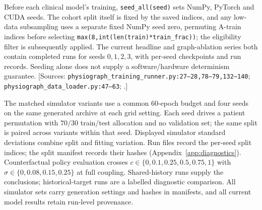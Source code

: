 Before each clinical model's training, \texttt{seed\_\allowbreak{}all(seed)} sets NumPy, PyTorch and CUDA seeds. The cohort split itself is fixed by the saved indices, and any low-data subsampling uses a separate fixed NumPy seed zero, permuting A-train indices before selecting \texttt{max(8,\allowbreak{}int(len(train)*train\_\allowbreak{}frac))}; the eligibility filter is subsequently applied. The current headline and graph-ablation series both contain completed runs for seeds $0,1,2,3$, with per-seed checkpoints and run records. Seeding alone does not supply a software/hardware determinism guarantee. [Sources: \texttt{physiograph\_\allowbreak{}training\_\allowbreak{}runner.\allowbreak{}py:\allowbreak{}27–\allowbreak{}28,\allowbreak{}78–\allowbreak{}79,\allowbreak{}132–\allowbreak{}140}; \texttt{physiograph\_\allowbreak{}data\_\allowbreak{}loader.\allowbreak{}py:\allowbreak{}47–\allowbreak{}63}; .]

The matched simulator variants use a common $60$-epoch budget and four seeds on the same generated archive at each grid setting. Each seed drives a patient permutation with $70/30$ train/test allocation and no validation set; the same split is paired across variants within that seed. Displayed simulator standard deviations combine split and fitting variation. Run files record the per-seed split indices; the split manifest records their hashes (Appendix~\ref{app:diagnostics}). Counterfactual policy evaluation crosses $c\in\{0,0.1,0.25,0.5,0.75,1\}$ with $\sigma\in\{0,0.08,0.15,0.25\}$ at full coupling. Shared-history runs supply the conclusions; historical-target runs are a labelled diagnostic comparison. All simulator sets carry generation settings and hashes in manifests, and all current model results retain run-level provenance.


